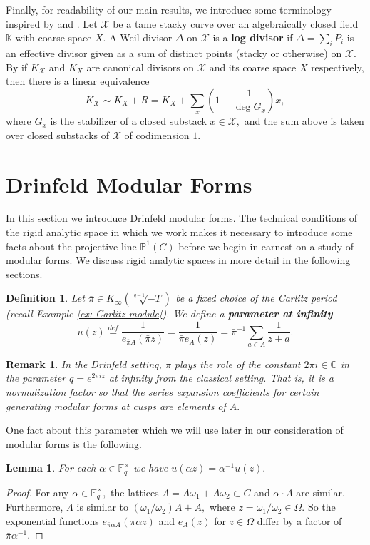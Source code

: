 \documentclass[11pt]{amsart}
\newtheorem{lemma}[theorem]{Lemma}
\newtheorem{definition}[theorem]{Definition}
\newtheorem{remark}[theorem]{Remark}
\theoremstyle{definition}
\numberwithin{equation}{section}
\newcommand{\sX}{\mathscr{X}}		%
\newcommand{\bbC}{\mathbb{C}}		%
\newcommand{\bbF}{\mathbb{F}}		%
\newcommand{\bbK}{\mathbb{K}}		%
\newcommand{\bbP}{\mathbb{P}}		%
\begin{document}
		Finally, for readability of our main results, we introduce some terminology inspired by \cite[Definition $5.6.2$]{VZB} and \cite[Proposition $5.5.6$]{VZB}. Let $\sX$ be a tame stacky curve over an algebraically closed field $\bbK$ with coarse space $X.$ A Weil divisor $\Delta$ on $\sX$ is a \textbf{log divisor} if $\Delta=\sum_i P_i$ is an effective divisor given as a sum of distinct points (stacky or otherwise) on $\sX.$ By \cite[Proposition $5.5.6$]{VZB} if $K_{\sX}$ and $K_X$ are canonical divisors on $\sX$ and its coarse space $X$ respectively, then there is a linear equivalence
		\[K_{\sX}\sim K_X+R=K_X+\sum_x \left(1-\frac{1}{\deg G_x}\right)x,\]
		where $G_x$ is the stabilizer of a closed substack $x\in \sX,$ and the sum above is taken over closed substacks of $\sX$ of codimension $1.$

		
		\section{Drinfeld Modular Forms}
		
		In this section we introduce Drinfeld modular forms. The technical conditions of the rigid analytic space in which we work makes it necessary to introduce some facts about the projective line $\bbP^1(C)$ before we begin in earnest on a study of modular forms. We discuss rigid analytic spaces in more detail in the following sections.
		
		\begin{definition}\label{d: parameter at infty}
			Let $\overline{\pi}\in K_{\infty}(\sqrt[q-1]{-T})$ be a fixed choice of the Carlitz period (recall Example \ref{ex: Carlitz module}). We define a \textbf{parameter at infinity} 
			\[u(z)\overset{def}{=}\frac{1}{e_{\overline{\pi}A}(\bar{\pi}z)}=\frac{1}{\bar{\pi}e_A(z)}=\bar{\pi}^{-1}\sum_{a\in A}\frac{1}{z+a}.\]
		\end{definition}
		\begin{remark}
			In the Drinfeld setting, $\overline{\pi}$ plays the role of the constant $2\pi i\in \bbC$ in the parameter $q=e^{2\pi i z}$ at infinity from the classical setting. That is, it is a normalization  factor so that the series expansion coefficients for certain generating modular forms at cusps are elements of $A.$ 
		\end{remark}
		
		One fact about this parameter which we will use later in our consideration of modular forms is the following. 
		\begin{lemma}\cite[Page $10$]{Gekeler-survey-Drinfeld-modular-forms}\label{l: u(a/d)=d/au}
			For each $\alpha\in \bbF_q^{\times}$ we have $\displaystyle{u\left(\alpha z\right)=\alpha^{-1}u(z)}.$
		\end{lemma}	
		\begin{proof}
			For any $\alpha \in \bbF_q^{\times},$ the lattices $\Lambda = A\omega_1+A\omega_2\subset C$ and $\alpha\cdot \Lambda$ are similar. Furthermore, $\Lambda$ is similar to $(\omega_1/\omega_2)A+A,$ where $z=\omega_1/\omega_2\in \Omega.$ So the exponential functions $e_{\bar{\pi}\alpha A}(\bar{\pi}\alpha z)$ and $e_A(z)$ for $z\in \Omega$ differ by a factor of $\bar{\pi}\alpha^{-1}.$
		\end{proof}
		
\end{document}
